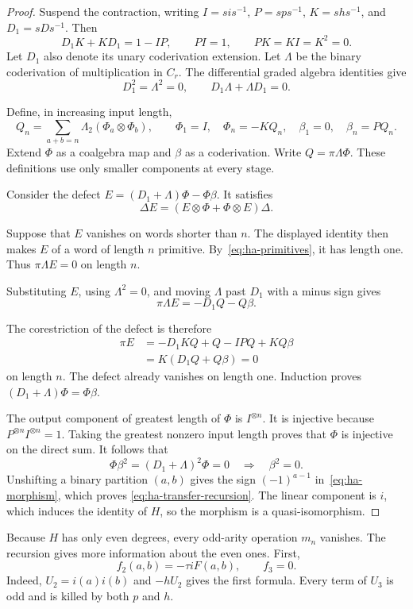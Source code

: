 \begin{proof}
Suspend the contraction, writing $I=si s^{-1}$, $P=sp s^{-1}$,
$K=shs^{-1}$, and $D_1=sDs^{-1}$. Then
\[
 D_1K+KD_1=1-IP,\qquad PI=1,\qquad PK=KI=K^2=0.
\]
Let $D_1$ also denote its unary coderivation extension.
Let $\Lambda$ be the binary coderivation of multiplication in $C_r$.
The differential graded algebra identities give
\[
 D_1^2=\Lambda^2=0,\qquad D_1\Lambda+\Lambda D_1=0.
\]

Define, in increasing input length,
\[
 Q_n=\sum_{a+b=n}\Lambda_2(\Phi_a\otimes\Phi_b),\qquad
 \Phi_1=I,\quad\Phi_n=-KQ_n,\quad\beta_1=0,\quad\beta_n=PQ_n.
\]
Extend $\Phi$ as a coalgebra map and $\beta$ as a coderivation.
Write $Q=\pi\Lambda\Phi$. These definitions use only smaller
components at every stage.

Consider the defect $E=(D_1+\Lambda)\Phi-\Phi\beta$.
It satisfies
\[
 \Delta E=(E\otimes\Phi+\Phi\otimes E)\Delta.
\]

Suppose that $E$ vanishes on words shorter than $n$.
The displayed identity then makes $E$ of a word of length $n$
primitive. By~\eqref{eq:ha-primitives}, it has length one.
Thus $\pi\Lambda E=0$ on length $n$.

Substituting $E$, using $\Lambda^2=0$, and moving $\Lambda$
past $D_1$ with a minus sign gives
\[
 \pi\Lambda E=-D_1Q-Q\beta.
\]

The corestriction of the defect is therefore
\[
 \begin{split}
 \pi E
 &=-D_1KQ+Q-IPQ+KQ\beta\\
 &=K(D_1Q+Q\beta)=0
 \end{split}
\]
on length $n$. The defect already vanishes on length one.
Induction proves $(D_1+\Lambda)\Phi=\Phi\beta$.

The output component of greatest length of $\Phi$ is $I^{\otimes n}$.
It is injective because $P^{\otimes n}I^{\otimes n}=1$.
Taking the greatest nonzero input length proves that $\Phi$ is
injective on the direct sum. It follows that
\[
 \Phi\beta^2=(D_1+\Lambda)^2\Phi=0
 \quad\Longrightarrow\quad\beta^2=0.
\]
Unshifting a binary partition $(a,b)$ gives the sign $(-1)^{a-1}$
in~\eqref{eq:ha-morphism}, which proves
\eqref{eq:ha-transfer-recursion}. The linear component is $i$,
which induces the identity of $H$, so the morphism is a
quasi-isomorphism.
\end{proof}

Because $H$ has only even degrees, every odd-arity operation $m_n$
vanishes. The recursion gives more information about the even ones.
First,
\[
 f_2(a,b)=-\tau iF(a,b),\qquad f_3=0.
\]
Indeed, $U_2=i(a)i(b)$ and $-hU_2$ gives the first formula.
Every term of $U_3$ is odd and is killed by both $p$ and $h$.

